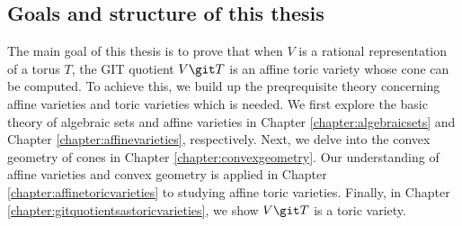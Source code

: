 \documentclass[12pt]{amsart}
\theoremstyle{plain}
\begin{document}
\newpage
\subsection*{Goals and structure of this thesis}
The main goal of this thesis is to prove that when $V$ is a rational representation of a torus $T$, the GIT quotient $V \git T$ is an affine toric variety whose cone can be computed.
To achieve this, we build up the preqrequisite theory concerning affine varieties and toric varieties which is needed.
We first explore the basic theory of algebraic sets and affine varieties in Chapter \ref{chapter:algebraicsets} and Chapter \ref{chapter:affinevarieties}, respectively.
Next, we delve into the convex geometry of cones in Chapter \ref{chapter:convexgeometry}.
Our understanding of affine varieties and convex geometry is applied in Chapter \ref{chapter:affinetoricvarieties} to studying affine toric varieties.
Finally, in Chapter \ref{chapter:gitquotientsastoricvarieties}, we show $V \git T$ is a toric variety.
\end{document}
